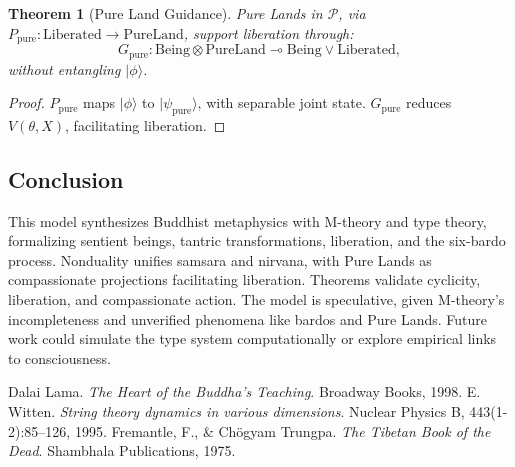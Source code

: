 \documentclass{article}
\newtheorem{theorem}{Theorem}
\begin{document}
\begin{theorem}[Pure Land Guidance]
\label{thm:pure-land}
Pure Lands in \( \mathcal{P} \), via \( P_{\text{pure}} : \text{Liberated} \to \text{PureLand} \), support liberation through:
\[
G_{\text{pure}} : \text{Being} \otimes \text{PureLand} \multimap \text{Being} \lor \text{Liberated},
\]
without entangling \( |\phi\rangle \).
\end{theorem}

\begin{proof}
\( P_{\text{pure}} \) maps \( |\phi\rangle \) to \( |\psi_{\text{pure}}\rangle \), with separable joint state. \( G_{\text{pure}} \) reduces \( V(\theta, X) \), facilitating liberation.
\end{proof}

\subsection{Conclusion}
\label{sec:conclusion}
This model synthesizes Buddhist metaphysics with M-theory and type theory, formalizing sentient beings, tantric transformations, liberation,
and the six-bardo process. Nonduality unifies samsara and nirvana, with Pure Lands as compassionate projections facilitating liberation. Theorems validate cyclicity, liberation, and compassionate action. The model is speculative, given M-theory’s incompleteness and unverified phenomena like bardos and Pure Lands. Future work could simulate the type system computationally or explore empirical links to consciousness.


\begin{thebibliography}{9}
Dalai Lama. \emph{The Heart of the Buddha’s Teaching}. Broadway Books, 1998.
E. Witten. \emph{String theory dynamics in various dimensions}. Nuclear Physics B, 443(1-2):85–126, 1995.
Fremantle, F., \& Chögyam Trungpa. \emph{The Tibetan Book of the Dead}. Shambhala Publications, 1975.
\end{thebibliography}
\end{document}

